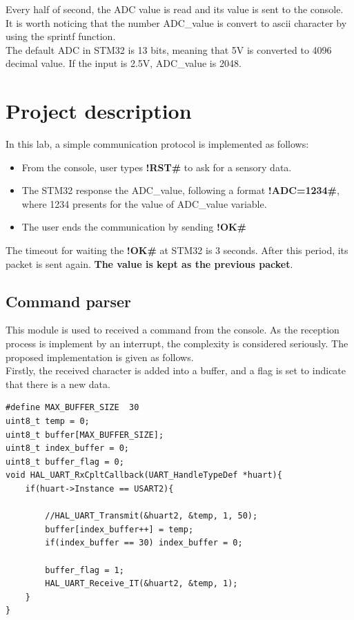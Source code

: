 \documentclass[twoside, final]{hcmut_report}
\begin{document}
Every half of second, the ADC value is read and its value is sent to the console. It is worth noticing that the number ADC\_value is convert to ascii character by  using the sprintf function.\\

The default ADC in STM32 is 13 bits, meaning that 5V is converted to 4096 decimal value. If the input is 2.5V, ADC\_value is 2048.

\section{Project description}
In this lab, a simple communication protocol is implemented as follows:
\begin{itemize}
    \item From the console, user types \textbf{!RST\#} to ask for a sensory data.
    \item The STM32 response the ADC\_value, following a format \textbf{!ADC=1234\#}, where 1234 presents for the value of ADC\_value variable.
    \item The user ends the communication by sending \textbf{!OK\#}
\end{itemize}

The timeout for waiting the \textbf{!OK\#} at STM32 is 3 seconds. After this period, its packet is sent again. \textbf{The value is kept as the previous packet}.

\subsection{Command parser}
This module is used to received a command from the console. As the reception process is implement by an interrupt, the complexity is considered seriously. The proposed implementation is given as follows.\\

Firstly, the received character is added into a buffer, and a flag is set to indicate that there is a new data.

\begin{lstlisting}[caption= Add the received character into a buffer]
#define MAX_BUFFER_SIZE  30
uint8_t temp = 0;
uint8_t buffer[MAX_BUFFER_SIZE];
uint8_t index_buffer = 0;
uint8_t buffer_flag = 0;
void HAL_UART_RxCpltCallback(UART_HandleTypeDef *huart){
	if(huart->Instance == USART2){

		//HAL_UART_Transmit(&huart2, &temp, 1, 50);
		buffer[index_buffer++] = temp;
		if(index_buffer == 30) index_buffer = 0;

		buffer_flag = 1;
		HAL_UART_Receive_IT(&huart2, &temp, 1);
	}
}
\end{lstlisting}
\end{document}
